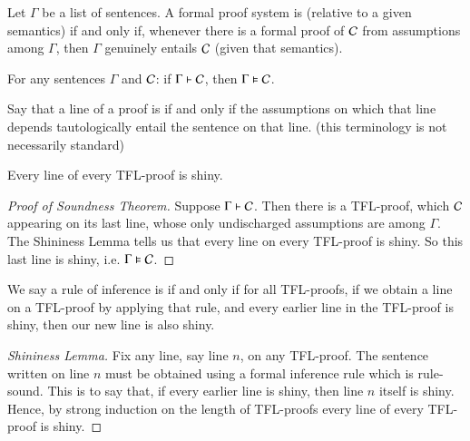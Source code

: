 \documentclass[12pt, a4paper, oneside, openright, titlepage]{book}
\begin{document}
\begin{defn}
    Let $\Gamma$ be a list of sentences. A formal proof system is  (relative to a given semantics) if and only if, whenever there is a formal proof of $\mathcal{C}$ from assumptions among $\Gamma$, then $\Gamma$ genuinely entails $\mathcal{C}$ (given that semantics). 
\end{defn}


\begin{namthm}
    For any sentences $\Gamma$ and $\mathcal{C}$: if $\Gamma \vdash \mathcal{C}$, then $\Gamma \vDash \mathcal{C}$.
\end{namthm}

\begin{defn}
    Say that a line of a proof is  if and only if the assumptions on which that line depends tautologically entail the sentence on that line. (this terminology is not necessarily standard)
\end{defn}


\begin{lem}
    Every line of every TFL-proof is shiny.
\end{lem}



\begin{proof}[Proof of Soundness Theorem]
    Suppose $\Gamma \vdash \mathcal{C}$. Then there is a TFL-proof, which $\mathcal{C}$ appearing on its last line, whose only undischarged assumptions are among $\Gamma$. The Shininess Lemma tells us that every line on every TFL-proof is shiny. So this last line is shiny, i.e. $\Gamma \vDash \mathcal{C}$.
\end{proof}

\begin{defn}
    We say a rule of inference is  if and only if for all TFL-proofs, if we obtain a line on a TFL-proof by applying that rule, and every earlier line in the TFL-proof is shiny, then our new line is also shiny.
\end{defn}


\begin{proof}[Shininess Lemma]
    Fix any line, say line $n$, on any TFL-proof. The sentence written on line $n$ must be obtained using a formal inference rule which is rule-sound. This is to say that, if every earlier line is shiny, then line $n$ itself is shiny. Hence, by strong induction on the length of TFL-proofs every line of every TFL-proof is shiny.
\end{proof}
\end{document}
